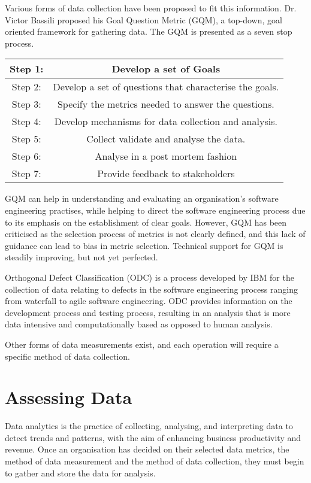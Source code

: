 \documentclass{article}
\begin{document}
Various forms of data collection have been proposed to fit this information. Dr. Victor Bassili proposed his Goal Question Metric (GQM), a top-down, goal oriented framework for gathering data. The GQM is presented as a seven stop process. \cite{wiki}

\begin{center}
\begin{tabular}{||c c||} 
\hline
Step 1: & Develop a set of Goals \\ 
\hline
Step 2: & Develop a set of questions that characterise the goals. \\ 
\hline
Step 3: & Specify the metrics needed to answer the questions. \\
\hline
Step 4: & Develop mechanisms for data collection and analysis. \\
\hline
Step 5: & Collect validate and analyse the data. \\
\hline
Step 6: & Analyse in a post mortem fashion \\ 
\hline
Step 7: & Provide feedback to stakeholders \\
\hline
\end{tabular}
\end{center}

GQM can help in understanding and evaluating an organisation's software engineering practises, while helping to direct the software engineering process due to its emphasis on the establishment of clear goals. However, GQM has been criticised as the selection process of metrics is not clearly defined, and this lack of guidance can lead to bias in metric selection. Technical support for GQM is steadily improving, but not yet perfected. \newline 

Orthogonal Defect Classification (ODC) is a process developed by IBM for the collection of data relating to defects in the software engineering process ranging from waterfall to agile software engineering. \cite{ODC} ODC provides information on the development process and testing process, resulting in an analysis that is more data intensive and computationally based as opposed to human analysis. \newline

Other forms of data measurements exist, and each operation will require a specific method of data collection.

\section{Assessing Data} Data analytics is the practice of collecting, analysing, and interpreting data to detect trends and patterns, with the aim of enhancing business productivity and revenue. Once an organisation has decided on their selected data metrics, the method of data measurement and the method of data collection, they must begin to gather and store the data for analysis. \newline
\end{document}
